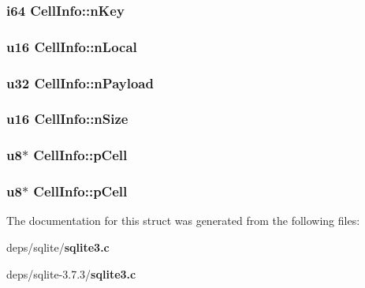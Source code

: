 \subsubsection{\setlength{\rightskip}{0pt plus 5cm}\bf{i64} \bf{Cell\-Info::n\-Key}}\label{structCellInfo_a1546aa70c5c09b820afb9645f84f59e}


\subsubsection{\setlength{\rightskip}{0pt plus 5cm}\bf{u16} \bf{Cell\-Info::n\-Local}}\label{structCellInfo_be92a679ac6c5110b4a4447eec315122}


\subsubsection{\setlength{\rightskip}{0pt plus 5cm}\bf{u32} \bf{Cell\-Info::n\-Payload}}\label{structCellInfo_4305ad06867a86dcbecc0fc65f254a8e}


\subsubsection{\setlength{\rightskip}{0pt plus 5cm}\bf{u16} \bf{Cell\-Info::n\-Size}}\label{structCellInfo_478cca286bbbf77b1391fb3175a973cd}


\subsubsection{\setlength{\rightskip}{0pt plus 5cm}\bf{u8}$\ast$ \bf{Cell\-Info::p\-Cell}}\label{structCellInfo_7de8972ecaedf0a01322f05f330e75d7}


\subsubsection{\setlength{\rightskip}{0pt plus 5cm}\bf{u8}$\ast$ \bf{Cell\-Info::p\-Cell}}\label{structCellInfo_7de8972ecaedf0a01322f05f330e75d7}




The documentation for this struct was generated from the following files:\begin{CompactItemize}
\item 
deps/sqlite/\bf{sqlite3.c}\item 
deps/sqlite-3.7.3/\bf{sqlite3.c}\end{CompactItemize}
